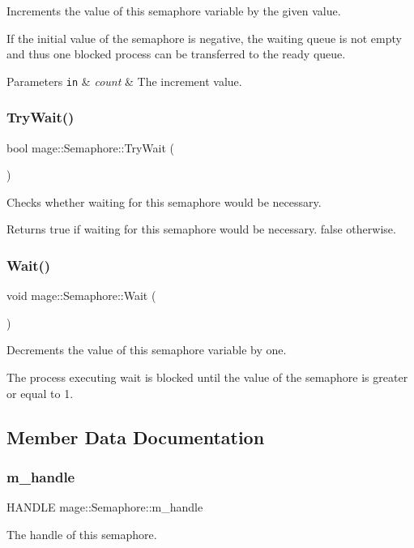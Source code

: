 Increments the value of this semaphore variable by the given value.

If the initial value of the semaphore is negative, the waiting queue is not empty and thus one blocked process can be transferred to the ready queue.


\begin{DoxyParams}[1]{Parameters}
\mbox{\tt in}  & {\em count} & The increment value. \\
\hline
\end{DoxyParams}
\hypertarget{structmage_1_1_semaphore_ab34cdf4e9b7388dbdb30aab167c074f6}{}\label{structmage_1_1_semaphore_ab34cdf4e9b7388dbdb30aab167c074f6} 
\subsubsection{\texorpdfstring{Try\+Wait()}{TryWait()}}
{\footnotesize\ttfamily bool mage\+::\+Semaphore\+::\+Try\+Wait (\begin{DoxyParamCaption}{ }\end{DoxyParamCaption})}

Checks whether waiting for this semaphore would be necessary.

\begin{DoxyReturn}{Returns}
{\ttfamily true} if waiting for this semaphore would be necessary. {\ttfamily false} otherwise. 
\end{DoxyReturn}
\hypertarget{structmage_1_1_semaphore_ae63599939b6bcc3939cbeddd7ffa5f66}{}\label{structmage_1_1_semaphore_ae63599939b6bcc3939cbeddd7ffa5f66} 
\subsubsection{\texorpdfstring{Wait()}{Wait()}}
{\footnotesize\ttfamily void mage\+::\+Semaphore\+::\+Wait (\begin{DoxyParamCaption}{ }\end{DoxyParamCaption})}

Decrements the value of this semaphore variable by one.

The process executing wait is blocked until the value of the semaphore is greater or equal to 1. 

\subsection{Member Data Documentation}
\hypertarget{structmage_1_1_semaphore_ac1ded856984b4ac3739d9ff627838fda}{}\label{structmage_1_1_semaphore_ac1ded856984b4ac3739d9ff627838fda} 
\subsubsection{\texorpdfstring{m\+\_\+handle}{m\_handle}}
{\footnotesize\ttfamily H\+A\+N\+D\+LE mage\+::\+Semaphore\+::m\+\_\+handle\hspace{0.3cm}{\ttfamily [private]}}

The handle of this semaphore. 